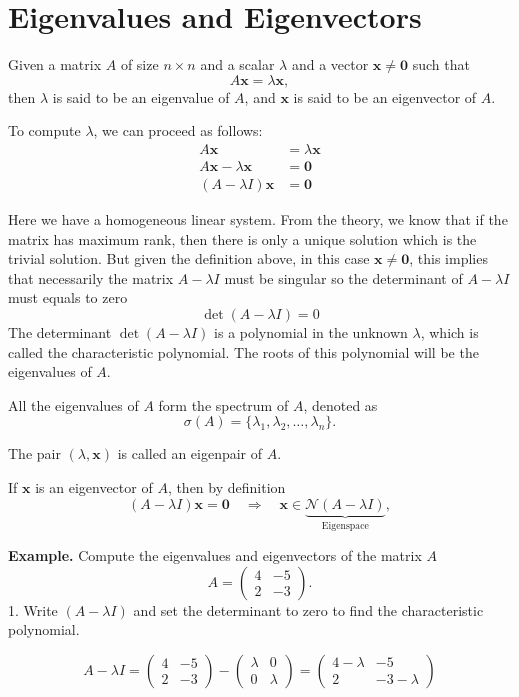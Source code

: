 \chapter[short]{Eigenvalues and Eigenvectors}
Given a matrix \( A \) of size \( n \times n \) and a scalar \( \lambda \) and a vector \( \mathbf{x} \neq \mathbf{0} \) such that
\[
A\mathbf{x} = \lambda \mathbf{x},
\]
then \( \lambda \) is said to be an eigenvalue of \( A \), and \( \mathbf{x} \) is said to be an eigenvector of \( A \).

To compute \( \lambda \), we can proceed as follows:
\begin{align*}
A\mathbf{x} &= \lambda \mathbf{x} \\
A\mathbf{x} - \lambda \mathbf{x} &= \mathbf{0} \\
(A - \lambda I)\mathbf{x} &= \mathbf{0}
\end{align*}

Here we have a homogeneous linear system. From the theory, we know that if the matrix has maximum rank,
then there is only a unique solution which is the trivial solution. But given the definition above, in this
case \( \mathbf{x} \neq \mathbf{0} \), this implies that necessarily the matrix \( A - \lambda I \) must be
singular so the determinant of \( A - \lambda I \) must equals to zero
\[
\det(A - \lambda I) = 0
\]
The determinant \( \det(A - \lambda I) \) is a polynomial in the unknown \( \lambda \),
which is called the characteristic polynomial. The roots of this polynomial will be the
eigenvalues of \( A \).

All the eigenvalues of \( A \) form the spectrum of \( A \), denoted as 
\[
\sigma(A) = \{ \lambda_1, \lambda_2, \ldots, \lambda_n \}.
\]

The pair \( (\lambda, \mathbf{x}) \) is called an eigenpair of \( A \).

If \( \mathbf{x} \) is an eigenvector of \( A \), then by definition
\[
(A - \lambda I)\mathbf{x} = \mathbf{0} \quad \Rightarrow \quad \mathbf{x} \in \underbrace{\mathcal{N}(A - \lambda I)}_{\text{Eigenspace}},
\]

\textbf{Example.} Compute the eigenvalues and eigenvectors of the matrix $A$
\[
A = \begin{pmatrix}
4 & -5 \\
2 & -3
\end{pmatrix}.
\]
1. Write \((A - \lambda I)\) and set the determinant to zero to find the characteristic polynomial.

$$ A - \lambda I = \begin{pmatrix}
4 & -5 \\
2 & -3
\end{pmatrix} - \begin{pmatrix}
\lambda & 0 \\
0 & \lambda
\end{pmatrix} = \begin{pmatrix}
4 - \lambda & -5 \\
2 & -3 - \lambda
\end{pmatrix} $$


